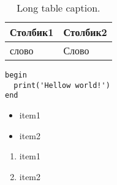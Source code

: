         \begin{center}
          \begin{xltabular}{\linewidth}{|l|X|}
            \caption{Long table caption.\label{long}}                                                                                                    \\
            \hline
            Столбик1  & Столбик2    \\
            \hline
            слово     & Слово       \\
            \hline
          \end{xltabular}
        \end{center}

        \begin{lstlisting}[caption={Название листинга}]
begin
  print('Hellow world!')
end
        \end{lstlisting}

        \begin{itemize}
          \item item1
          \item item2
        \end{itemize}

        \begin{enumerate}
          \item item1
          \item item2
        \end{enumerate}
